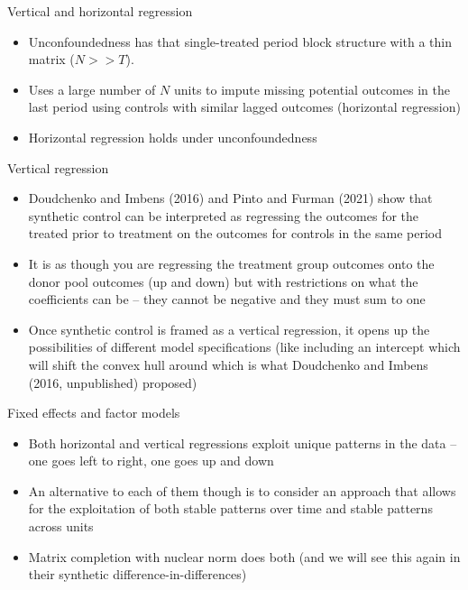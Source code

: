 \documentclass{beamer}
\begin{document}
\begin{frame}{Vertical and horizontal regression}

\begin{itemize}
\item Unconfoundedness has that single-treated period block structure with a thin matrix ($N>>T$). 
\item Uses a large number of $N$ units to impute missing potential outcomes in the last period using controls with similar lagged outcomes (horizontal regression)
\item Horizontal regression holds under unconfoundedness
\end{itemize}

\end{frame}

\begin{frame}{Vertical regression}

\begin{itemize}
\item Doudchenko and Imbens (2016) and Pinto and Furman (2021) show that synthetic control can be interpreted as regressing the outcomes for the treated prior to treatment on the outcomes for controls in the same period
\item It is as though you are regressing the treatment group outcomes onto the donor pool outcomes (up and down) but with restrictions on what the coefficients can be -- they cannot be negative and they must sum to one
\item Once synthetic control is framed as a vertical regression, it opens up the possibilities of different model specifications (like including an intercept which will shift the convex hull around which is what Doudchenko and Imbens (2016, unpublished) proposed)
\end{itemize}

\end{frame}

\begin{frame}{Fixed effects and factor models}

\begin{itemize}
\item Both horizontal and vertical regressions exploit unique patterns in the data -- one goes left to right, one goes up and down
\item An alternative to each of them though is to consider an approach that allows for the exploitation of both stable patterns over time and stable patterns across units
\item Matrix completion with nuclear norm does both (and we will see this again in their synthetic difference-in-differences)
\end{itemize}

\end{frame}
\end{document}
